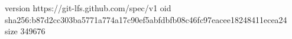 version https://git-lfs.github.com/spec/v1
oid sha256:b87d2cc303ba5771a774a17c90ef5abfdbfb08c46fc97eacee18248411ecea24
size 349676
